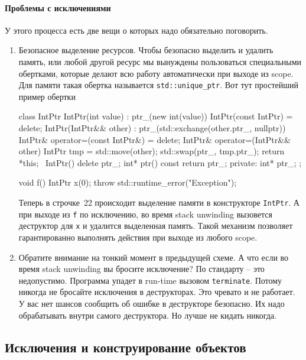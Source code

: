 \paragraph{Проблемы с исключениями}

У этого процесса есть две вещи о которых надо обязательно поговорить.
\begin{enumerate}
\item Безопасное выделение ресурсов.
Чтобы безопасно выделить и удалить память, или любой другой ресурс мы вынуждены пользоваться специальными обертками, которые делают всю работу автоматически при выходе из scope.
Для памяти такая обертка называется \verb"std::unique_ptr".
Вот тут простейший пример обертки
\begin{cppcode}
class IntPtr {
  IntPtr(int value) : ptr_(new int(value)) {}
  IntPtr(const IntPtr) = delete;
  IntPtr(IntPtr&& other) : ptr_(std::exchange(other.ptr_, nullptr)) {}
  IntPtr& operator=(const IntPtr&) = delete;
  IntPtr& operator=(IntPtr&& other) {
    IntPtr tmp = std::move(other);
    std::swap(ptr_, tmp.ptr_);
    return *this;
  }
  ~IntPtr() {
    delete ptr_;
  }
  int* ptr() const {
    return ptr_;
  }
private:
  int* ptr_;
};

void f() {
  IntPtr x(0);
  throw std::runtime_error("Exception");
}
\end{cppcode}
Теперь в строчке~22 происходит выделение памяти в конструкторе \verb"IntPtr".
А при выходе из \verb"f" по исключению, во время stack unwinding вызовется деструктор для \verb"x" и удалится выделенная память.
Такой механизм позволяет гарантированно выполнять действия при выходе из любого scope.

\item Обратите внимание на тонкий момент в предыдущей схеме.
А что если во время stack unwinding вы бросите исключение?
По стандарту -- это недопустимо.
Программа упадет в run-time вызовом \verb"terminate".
Потому никогда не бросайте исключения в деструкторах.
Это чревато и не работает.
У вас нет шансов сообщить об ошибке в деструкторе безопасно.
Их надо обрабатывать внутри самого деструктора.
Но лучше не кидать никогда.
\end{enumerate}

\subsection{Исключения и конструирование объектов}

